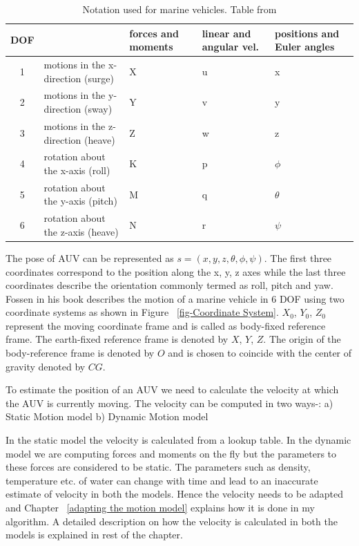 \documentclass[12pt]{dalcsthesis}
\begin{document}
\begin{table}[tbh]
\centering
\label{marine notation}
\begin{tabular}{|c|>{\centering}p{3cm}|>{\centering}p{3cm}|>{\centering}p{3cm}|>{\centering}p{3cm}|}
\hline 
DOF &  & forces and moments & linear and angular vel. & positions and Euler angles\tabularnewline
\hline 
\hline 
1 & motions in the x-direction (surge) & X & u & x\tabularnewline
\hline 
2 & motions in the y-direction (sway) & Y & v & y\tabularnewline
\hline 
3 & motions in the z-direction (heave) & Z & w & z\tabularnewline
\hline 
4 & rotation about the x-axis (roll) & K & p & $\phi$\tabularnewline
\hline 
5 & rotation about the y-axis (pitch) & M & q & $\theta$\tabularnewline
\hline 
6 & rotation about the z-axis (heave) & N & r & $\psi$\tabularnewline
\hline 
\end{tabular}
\caption{Notation used for marine vehicles. Table from \cite{Thor}}
\end{table}




The pose of AUV can be represented as $s=(x,y,z,\theta,\phi,\psi)$. The first three coordinates correspond to the position along the x, y, z axes while the last three coordinates describe the orientation commonly termed as roll, pitch and yaw. Fossen \cite{Thor} in his book describes the motion of a marine vehicle in 6 DOF using two coordinate systems as shown in Figure ~\ref{fig-Coordinate System}. $X_0$, $Y_0$, $Z_0$ represent the moving coordinate frame and is called as body-fixed reference frame. The earth-fixed reference frame is denoted by $X$, $Y$, $Z$. The origin of the body-reference frame is denoted by $O$ and is chosen to coincide with the center of gravity denoted by $CG$.  

To estimate the position of an AUV we need to calculate the velocity at which the AUV is currently moving. The velocity can be computed in two ways-: a) Static Motion model b) Dynamic Motion model

In the static model the velocity is calculated from a lookup table. In the dynamic model we are computing forces and moments on the fly but the parameters to these forces are considered to be static. The parameters such as density, temperature etc. of water can change with time and lead to an inaccurate estimate of velocity in both the models. Hence the velocity needs to be adapted and Chapter ~\ref{adapting the motion model} explains how it is done in my algorithm. A detailed description on how the velocity is calculated in both the models is explained in rest of the chapter.
\end{document}
